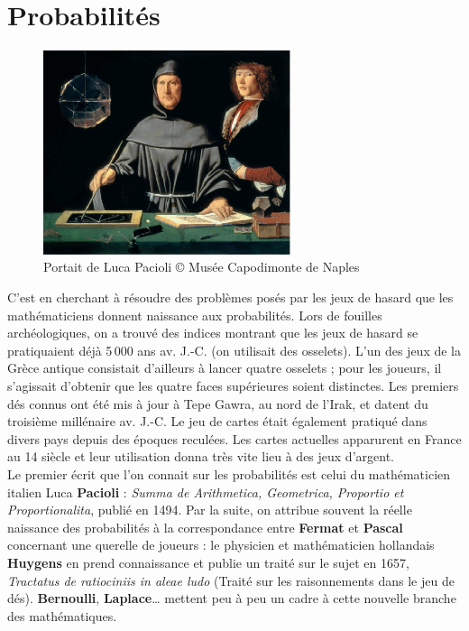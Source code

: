 \chapter{Probabilités} \label{D7}

\bigskip

\begin{figure}[h]
   \centering
      \includegraphics[height=6cm]{Organisation_gestion_donnees/Images/D7_intro_Pacioli}
   \caption{Portait de Luca Pacioli © Musée Capodimonte de Naples}
\end{figure}


\begin{prerequis}
   C’est en cherchant à résoudre des problèmes posés par les jeux de hasard que les mathématiciens donnent naissance aux probabilités. Lors de fouilles archéologiques, on a trouvé des indices montrant que les jeux de hasard se pratiquaient déjà 5\,000 ans av. J.-C. (on utilisait des osselets). L’un des jeux de la Grèce antique consistait d’ailleurs à lancer quatre osselets ; pour les joueurs, il s’agissait d’obtenir que les quatre faces supérieures soient distinctes. Les premiers dés connus ont été mis à jour à Tepe Gawra, au nord de l’Irak, et datent du troisième millénaire av. J.-C. Le jeu de cartes était également pratiqué dans divers pays depuis des époques reculées. Les cartes actuelles apparurent en France au 14 siècle et leur utilisation donna très vite lieu à des jeux d’argent. \\
   Le premier écrit que l’on connait sur les probabilités est celui du mathématicien italien Luca {\bf Pacioli} : {\it Summa de Arithmetica, Geometrica, Proportio et Proportionalita}, publié en 1494. Par la suite, on attribue souvent la réelle naissance des probabilités à la correspondance entre {\bf Fermat} et {\bf Pascal} concernant une querelle de joueurs : le physicien et mathématicien hollandais {\bf Huygens} en prend connaissance et publie un traité sur le sujet en 1657, {\it Tractatus de ratiociniis in aleae ludo} (Traité sur les raisonnements dans le jeu de dés). {\bf Bernoulli}, {\bf Laplace}\dots{} mettent peu à peu un cadre à cette nouvelle branche des mathématiques.
\end{prerequis}

